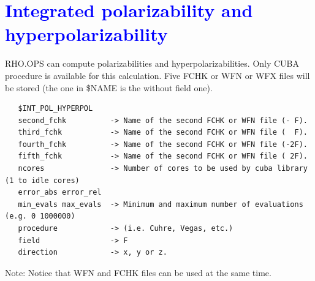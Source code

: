 \documentclass[10pt,a4paper]{article}
\newcommand{\tbl}[1]{{\textcolor{blue}{#1}}}
\begin{document}
{\section{\tbl{\textbf{Integrated polarizability and hyperpolarizability}}}
\noindent RHO.OPS can compute polarizabilities and hyperpolarizabilities. Only CUBA procedure is available for this calculation. Five FCHK or WFN or WFX files will be stored (the one in \$NAME is the without field one). 
\begin{verbatim}
   $INT_POL_HYPERPOL
   second_fchk          -> Name of the second FCHK or WFN file (- F). 
   third_fchk           -> Name of the second FCHK or WFN file (  F). 
   fourth_fchk          -> Name of the second FCHK or WFN file (-2F). 
   fifth_fchk           -> Name of the second FCHK or WFN file ( 2F). 
   ncores               -> Number of cores to be used by cuba library (1 to idle cores) 
   error_abs error_rel    
   min_evals max_evals  -> Minimum and maximum number of evaluations (e.g. 0 1000000)
   procedure            -> (i.e. Cuhre, Vegas, etc.)
   field                -> F
   direction            -> x, y or z.  
\end{verbatim}
Note: Notice that WFN and FCHK files can be used at the same time.\\
}
\end{document}
